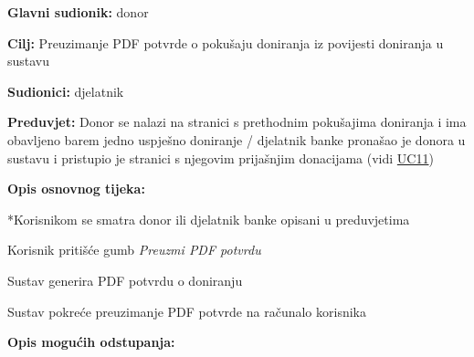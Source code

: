 					\noindent {}
					\begin{packed_item} \label{UC12}
	
						\item \textbf{Glavni sudionik: }donor
						\item  \textbf{Cilj:} Preuzimanje PDF potvrde o pokušaju doniranja iz povijesti doniranja u sustavu
						\item  \textbf{Sudionici:} djelatnik
						\item  \textbf{Preduvjet:} Donor se nalazi na stranici s prethodnim pokušajima doniranja i ima obavljeno barem jedno uspješno doniranje / djelatnik banke pronašao je donora u sustavu i pristupio je stranici s njegovim prijašnjim donacijama (vidi \hyperref[UC11]{UC11})
						\item  \textbf{Opis osnovnog tijeka:}
						
						*Korisnikom se smatra donor ili djelatnik banke opisani u preduvjetima
						\item[] \begin{packed_enum}
	                        \item Korisnik pritišće gumb \textit{Preuzmi PDF potvrdu} 
	                        \item Sustav generira PDF potvrdu o doniranju
	                        \item Sustav pokreće preuzimanje PDF potvrde na računalo korisnika
						\end{packed_enum}
						
						\item  \textbf{Opis mogućih odstupanja:}
						
					\end{packed_item}
					
